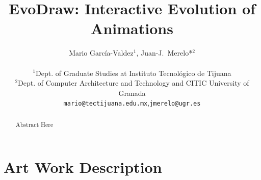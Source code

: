 \documentclass[letterpaper]{article}
\title{EvoDraw: Interactive Evolution of Animations}
\author{ Mario Garc\'ia-Valdez$^1$, Juan-J.~Merelo*$^2$\\
\mbox{}\\
$^1$Dept. of Graduate Studies at Instituto Tecnol\'ogico de Tijuana \\
$^2$Dept. of Computer Architecture and Technology and CITIC University of Granada \\

{\tt mario@tectijuana.edu.mx},{\tt jmerelo@ugr.es}}
\begin{document}
\maketitle

\begin{abstract}
Abstract Here
\end{abstract}

\section{Art Work Description}
\label{Description}




\end{document}
